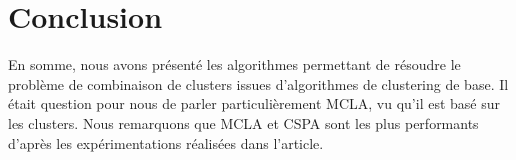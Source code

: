 \documentclass[12pt, french, latin.medieval, a4paper]{report}
\begin{document}
	\section{Conclusion}
	En somme, nous avons présenté les algorithmes permettant de résoudre le problème de combinaison de clusters issues d'algorithmes de clustering de base.
	Il était question pour nous de parler particulièrement MCLA, vu qu'il est basé sur les clusters.
	Nous remarquons que MCLA et CSPA sont les plus performants d'après les expérimentations réalisées dans l'article.



    
\end{document}
